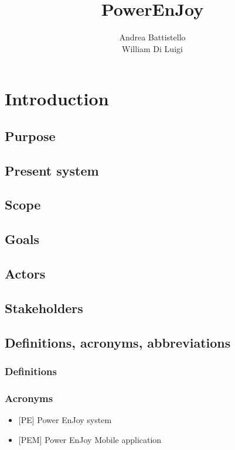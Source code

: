 \documentclass[12pt, a4paper]{article}
\title{{\Huge PowerEnJoy}}
\author{
	Andrea Battistello
	\\
	William Di Luigi
}
\begin{document}
\maketitle
\tableofcontents



\newpage
\section{Introduction}
	\subsection{Purpose}

	\subsection{Present system}
	
	\subsection{Scope}
	
	\subsection{Goals}

	\subsection{Actors}

	\subsection{Stakeholders}
	
	\subsection{Definitions, acronyms, abbreviations}
	
			\subsubsection{Definitions}
					
			\subsubsection{Acronyms}
				\begin{itemize}
					\item {[PE]} Power EnJoy system
					\item {[PEM]} Power EnJoy Mobile application
				\end{itemize}
					
\end{document}
